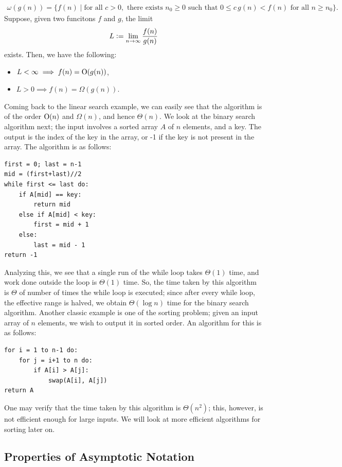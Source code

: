 \begin{align}
    \omega(g(n)) = \{f(n) \mid \text{for all } c > 0, \text{ there exists } n_{0} \geq 0 \text{ such that } 0 \leq c \, g(n) < f(n) \text{ for all } n \geq n_{0}\}.
\end{align}
Suppose, given two funcitons $f$ and $g$, the limit
\begin{align}
    L \vcentcolon= \lim_{n \to \infty} \frac{f(n)}{g(n)}
\end{align}
exists. Then, we have the following:
\begin{itemize}
    \item $L < \infty \implies f(n) = \operatorname{O}(g(n))$,
    \item $L > 0 \implies f(n) = \Omega(g(n))$.
\end{itemize}
Coming back to the linear search example, we can easily see that the algorithm is of the order $\operatorname{O}(n)$ and $\Omega(n)$, and hence $\Theta(n)$. We look at the binary search algorithm next; the input involves a sorted array $A$ of $n$ elements, and a key. The output is the index of the key in the array, or -1 if the key is not present in the array. The algorithm is as follows:
\begin{verbatim}
first = 0; last = n-1
mid = (first+last)//2
while first <= last do:
    if A[mid] == key:
        return mid
    else if A[mid] < key:
        first = mid + 1
    else:
        last = mid - 1
return -1
\end{verbatim}
Analyzing this, we see that a single run of the while loop takes $\Theta(1)$ time, and work done outside the loop is $\Theta(1)$ time. So, the time taken by this algorithm is $\Theta$ of number of times the while loop is executed; since after every while loop, the effective range is halved, we obtain $\Theta(\log n)$ time for the binary search algorithm. Another classic example is one of the sorting problem; given an input array of $n$ elements, we wish to output it in sorted order. An algorithm for this is as follows:
\begin{verbatim}
for i = 1 to n-1 do:
    for j = i+1 to n do:
        if A[i] > A[j]:
            swap(A[i], A[j])
return A
\end{verbatim}
One may verify that the time taken by this algorithm is $\Theta(n^{2})$; this, however, is not efficient enough for large inputs. We will look at more efficient algorithms for sorting later on.

\subsection{Properties of Asymptotic Notation}
